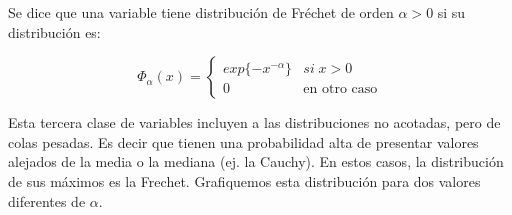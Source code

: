 \documentclass[
  oneside]{book}
\begin{document}
Se dice que una variable tiene distribución de Fréchet de orden
\(\alpha>0\) si su distribución es:

\begin{equation}
\Phi_{\alpha}(x)=\begin{cases}
exp\{-x^{-\alpha}\} & si\;x>0\\
0 & \text{en otro caso}
\end{cases}
\end{equation}

Esta tercera clase de variables incluyen a las distribuciones no
acotadas, pero de colas pesadas. Es decir que tienen una probabilidad
alta de presentar valores alejados de la media o la mediana (ej. la
Cauchy). En estos casos, la distribución de sus máximos es la Frechet.
Grafiquemos esta distribución para dos valores diferentes de \(\alpha\).
\end{document}
